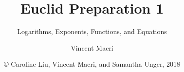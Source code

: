 

\title{Euclid Preparation 1}
\subtitle{Logarithms, Exponents, Functions, and Equations}
\author{Vincent Macri}
\date{\copyright{} Caroline Liu, Vincent Macri, and Samantha Unger, 2018}


	\frame{\titlepage}
	
	
	\tableofcontents

